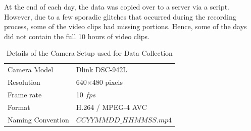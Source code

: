 At the end of each day, the data was copied over to a server via a script. However, due to a few sporadic glitches that occurred during the recording process, some of the video clips had missing portions. Hence, some of the days did not contain the full 10 hours of video clips.

\begin{table}[!bt]\centering
\caption{Details of the Camera Setup used for Data Collection}
\begin{tabular}{|l|l|}
\hline
Camera Model & Dlink DSC-942L        \\
Resolution   & 640$\times$480 pixels \\
Frame rate   & 10 $fps$             \\
Format       & H.264 / MPEG-4 AVC    \\
Naming Convention & $CCYYMMDD\_HHMMSS.mp4$ \\
\hline
\end{tabular}
\end{table}

